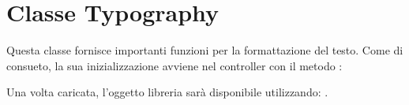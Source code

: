 \section{Classe Typography}
\label{class:tipografia}

Questa classe fornisce importanti funzioni per la formattazione del testo. Come di consueto, la sua inizializzazione avviene nel controller con il metodo :


Una volta caricata, l'oggetto libreria sarà disponibile utilizzando: .


